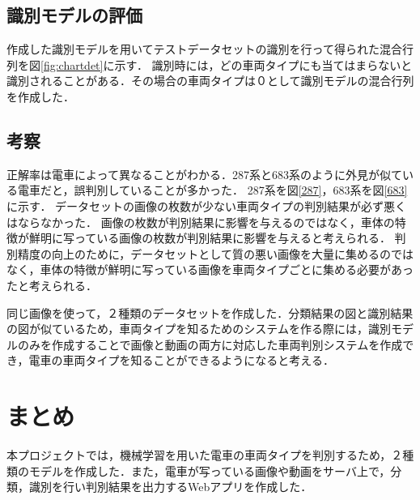 \begin{multicols*}{2}
\subsection{識別モデルの評価}
作成した識別モデルを用いてテストデータセットの識別を行って得られた混合行列を図\ref{fig:chartdet}に示す．
識別時には，どの車両タイプにも当てはまらないと識別されることがある．その場合の車両タイプは０として識別モデルの混合行列を作成した．





\subsection{考察}
正解率は電車によって異なることがわかる．287系と683系のように外見が似ている電車だと，誤判別していることが多かった．
287系を図\ref{287}，683系を図\ref{683}に示す．
データセットの画像の枚数が少ない車両タイプの判別結果が必ず悪くはならなかった．
画像の枚数が判別結果に影響を与えるのではなく，車体の特徴が鮮明に写っている画像の枚数が判別結果に影響を与えると考えられる．
判別精度の向上のために，データセットとして質の悪い画像を大量に集めるのではなく，車体の特徴が鮮明に写っている画像を車両タイプごとに集める必要があったと考えられる．

同じ画像を使って，２種類のデータセットを作成した．分類結果の図と識別結果の図が似ているため，車両タイプを知るためのシステムを作る際には，識別モデルのみを作成することで画像と動画の両方に対応した車両判別システムを作成でき，電車の車両タイプを知ることができるようになると考える．

\section{まとめ}
本プロジェクトでは，機械学習を用いた電車の車両タイプを判別するため，２種類のモデルを作成した．また，電車が写っている画像や動画をサーバ上で，分類，識別を行い判別結果を出力するWebアプリを作成した．


\end{multicols*}
